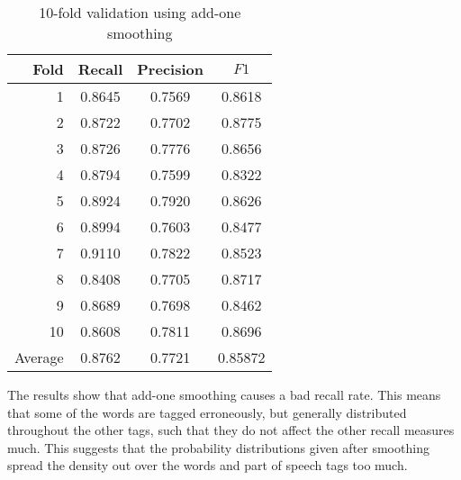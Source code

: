 \documentclass[12pt]{homework}
\begin{document}
\begin{table}
	\begin{center}
	\begin{tabular}{r | c c c}
	\hline
	Fold	&	Recall	&	Precision& $F1$ \\
	\hline
	1	 &	0.8645	&	0.7569	&	0.8618\\
	2	 &	0.8722	&	0.7702	&	0.8775\\
	3	 &	0.8726	&	0.7776	&	0.8656\\
	4	 &	0.8794	&	0.7599	&	0.8322\\
	5	 &	0.8924	&	0.7920	&	0.8626\\
	6	 &	0.8994	&	0.7603	&	0.8477\\
	7	 &	0.9110	&	0.7822	&	0.8523\\
	8	 &	0.8408	&	0.7705	&	0.8717\\
	9	 &	0.8689	&	0.7698	&	0.8462\\
	10	 &	0.8608	&	0.7811	&	0.8696\\
	\hline
Average	 &	0.8762	&	0.7721	&	0.85872\\
	\hline
	\end{tabular}
	\end{center}
	\caption{10-fold validation using add-one smoothing}
	\label{addoneresult}
\end{table}
The results show that add-one smoothing causes a bad recall rate. This means 
that some of the words are tagged erroneously, but generally distributed 
throughout the other tags, such that they do not affect the other recall 
measures much. This suggests that the probability distributions given after 
smoothing spread the density out over the words and part of speech tags too 
much.
\end{document}
